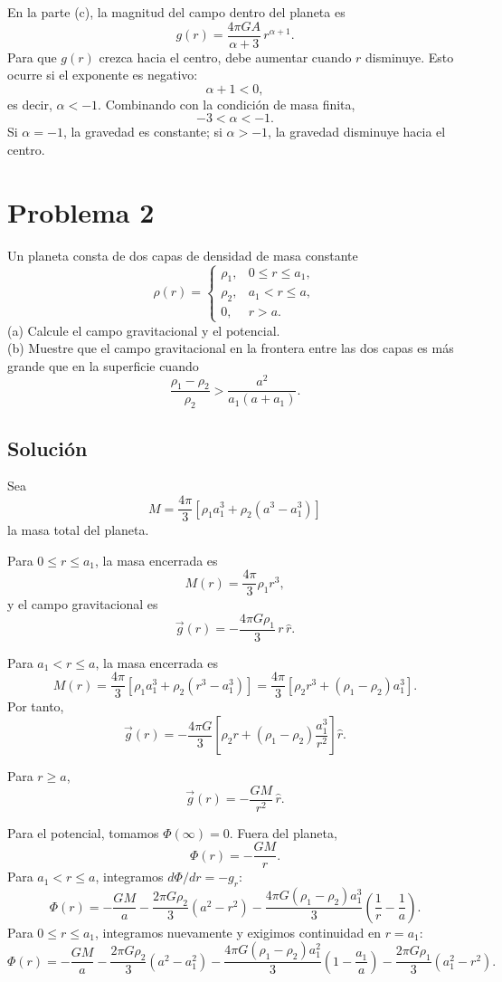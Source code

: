 \documentclass[a4paper]{article}
\begin{document}
En la parte (c), la magnitud del campo dentro del planeta es
$$
g(r)=\frac{4\pi G A}{\alpha+3}\,r^{\alpha+1}.
$$
Para que $g(r)$ crezca hacia el centro, debe aumentar cuando $r$ disminuye. Esto ocurre si el exponente es negativo:
$$
\alpha+1<0,
$$
es decir, $\alpha<-1$. Combinando con la condición de masa finita,
$$
\boxed{-3<\alpha<-1.}
$$
Si $\alpha=-1$, la gravedad es constante; si $\alpha>-1$, la gravedad disminuye hacia el centro.


\section{Problema 2}

Un planeta consta de dos capas de densidad de masa constante
$$
\rho(r)=
\left\{
\begin{array}{ll}
\rho_1, & 0\le r\le a_1,\\[1mm]
\rho_2, & a_1<r\le a,\\[1mm]
0, & r>a.
\end{array}
\right.
$$
(a) Calcule el campo gravitacional y el potencial. \\
(b) Muestre que el campo gravitacional en la frontera entre las dos capas es más grande que en la superficie cuando
$$
\frac{\rho_1-\rho_2}{\rho_2}>\frac{a^2}{a_1(a+a_1)}.
$$



\subsection{Solución}
Sea
$$
M=\frac{4\pi}{3}\left[\rho_1 a_1^3+\rho_2(a^3-a_1^3)\right]
$$
la masa total del planeta.

Para $0\le r\le a_1$, la masa encerrada es
$$
M(r)=\frac{4\pi}{3}\rho_1 r^3,
$$
y el campo gravitacional es
$$
\vec g(r)=-\frac{4\pi G\rho_1}{3}\,r\,\hat r.
$$

Para $a_1<r\le a$, la masa encerrada es
$$
M(r)=\frac{4\pi}{3}
\left[
\rho_1 a_1^3+\rho_2(r^3-a_1^3)
\right]
=
\frac{4\pi}{3}
\left[
\rho_2 r^3+(\rho_1-\rho_2)a_1^3
\right].
$$
Por tanto,
$$
\vec g(r)
=
-\frac{4\pi G}{3}
\left[
\rho_2 r+(\rho_1-\rho_2)\frac{a_1^3}{r^2}
\right]\hat r.
$$

Para $r\ge a$,
$$
\vec g(r)=-\frac{GM}{r^2}\,\hat r.
$$

Para el potencial, tomamos $\Phi(\infty)=0$. Fuera del planeta,
$$
\Phi(r)=-\frac{GM}{r}.
$$
Para $a_1<r\le a$, integramos $d\Phi/dr=-g_r$:
$$
\Phi(r)
=
-\frac{GM}{a}
-\frac{2\pi G\rho_2}{3}(a^2-r^2)
-\frac{4\pi G(\rho_1-\rho_2)a_1^3}{3}
\left(\frac{1}{r}-\frac{1}{a}\right).
$$
Para $0\le r\le a_1$, integramos nuevamente y exigimos continuidad en $r=a_1$:
$$
\Phi(r)
=
-\frac{GM}{a}
-\frac{2\pi G\rho_2}{3}(a^2-a_1^2)
-\frac{4\pi G(\rho_1-\rho_2)a_1^2}{3}
\left(1-\frac{a_1}{a}\right)
-\frac{2\pi G\rho_1}{3}(a_1^2-r^2).
$$
\end{document}
